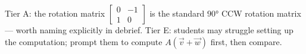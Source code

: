 \documentclass[10pt]{article}
\begin{document}
\begin{teachernote}
Tier A: the rotation matrix $\begin{bmatrix}0&-1\\1&0\end{bmatrix}$ is the standard
$90°$ CCW rotation matrix --- worth naming explicitly in debrief.
Tier E: students may struggle setting up the computation; prompt them to compute
$A(\vec{v}+\vec{w})$ first, then compare.
\end{teachernote}
\end{document}
